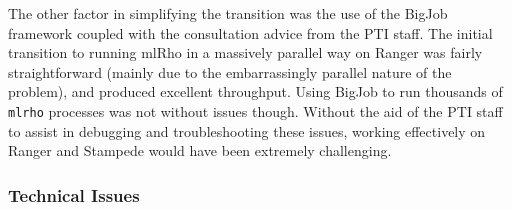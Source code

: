 \documentclass{sig-alternate}
\newcommand{\abhi}[1]{ {\textcolor{red} { ***Abhinav: #1 }}}
\newcommand{\abhi}[1]{ {}}
\newcommand{\ty}{\texttt}
\begin{document}
The other factor in simplifying  the transition was the use of the BigJob framework coupled with the
consultation advice from the PTI staff. The initial transition to running mlRho in a massively parallel
way on Ranger was fairly straightforward (mainly due to the embarrassingly parallel nature of the problem),
and produced excellent throughput. Using BigJob to run thousands of \ty{mlrho} processes was not without
issues though. Without the aid of the PTI staff to assist in debugging and troubleshooting these issues,
working effectively on Ranger and Stampede would have been extremely challenging. 
\subsubsection{Technical Issues }
\end{document}
